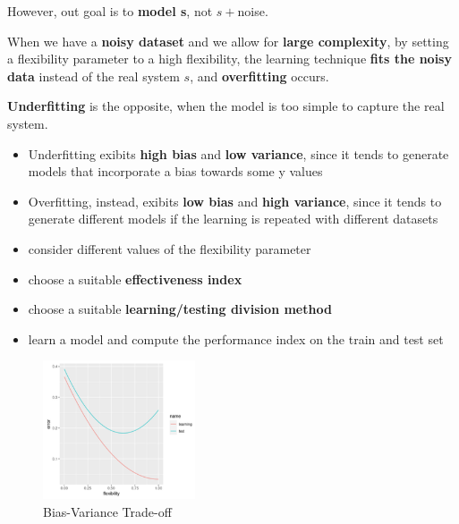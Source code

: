 However, out goal is to \textbf{model s}, not $s+$noise.

\begin{definitionblock}[Overfitting]
    When we have a \textbf{noisy dataset} and we allow for \textbf{large complexity}, by setting a flexibility parameter to a high flexibility, the learning technique \textbf{fits the noisy data} instead of the real system $s$, and \textbf{overfitting} occurs.
\end{definitionblock}

\textbf{Underfitting} is the opposite, when the model is too simple to capture the real system.

\begin{itemize}
    \item Underfitting exibits \textbf{high bias} and \textbf{low variance}, since it tends to generate models that incorporate a bias towards some y values 
    \item Overfitting, instead, exibits \textbf{low bias} and \textbf{high variance}, since it tends to generate different models if the learning is repeated with different datasets 
\end{itemize}

\begin{exampleblock}
    \begin{itemize}
        \item consider different values of the flexibility parameter
        \item choose a suitable \textbf{effectiveness index }
        \item choose a suitable \textbf{learning/testing division method} 
        \item learn a model and compute the performance index on the train and test set 
    \end{itemize}
\end{exampleblock}

\begin{center}
    \begin{figure}[H]
        \centering
        \includegraphics[width=0.4\textwidth]{assets/fig17.png}
        \caption{Bias-Variance Trade-off}
    \end{figure}
\end{center}

